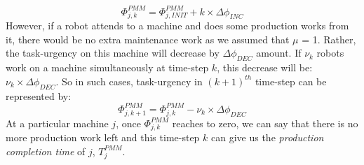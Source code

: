\documentclass{llncs}
\begin{document}
\begin{equation}
\Phi_{j, k}^{PMM} =\Phi_{j, INIT}^{PMM} + k \times \Delta \phi_{INC}
\label{eqn:task-urgency-prod-case1}
\end{equation}
However, if a robot attends to a machine and does some production works from it, there would be no extra maintenance work as we assumed that $\mu$ = 1. Rather, the task-urgency on this machine will decrease by $\Delta \phi_{DEC}$ amount. If $\nu_{k}$ robots work on a machine simultaneously at time-step $k$, this decrease will be: $\nu_{k} \times \Delta \phi_{DEC}$. So in such cases, task-urgency in $(k+1)^{th}$ time-step can be represented by:
\begin{equation}
\Phi_{j, k+1}^{PMM} = \Phi_{j, k}^{PMM} - \nu_{k} \times \Delta \phi_{DEC}
\label{eqn:task-urgency-prod-case2}
\end{equation}
At a particular machine $j$, once $\Phi_{j, k}^{PMM}$ reaches to zero, we can say that there is no more production work left and this time-step $k$ can give us the {\em production completion time} of $j$, $T_{j}^{PMM}$. %




\end{document}
